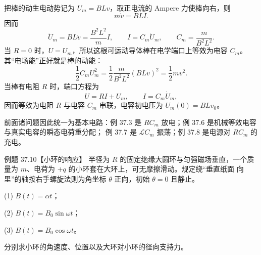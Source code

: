 \begin{xesolution}
把棒的动生电动势记为 $U_m=BLv$，取正电流的 Ampere 力使棒向右，则
\begin{equation}
  m\dot v=BLI.
\end{equation}
因而
\begin{equation}
  \dot U_m=BL\dot v=\frac{B^2L^2}{m}I,
  \qquad
  \boxed{I=C_m\dot U_m},
  \qquad
  \boxed{C_m=\frac{m}{B^2L^2}}.
\end{equation}
当 $R=0$ 时，$U=U_m$，所以这根可运动导体棒在电学端口上等效为电容 $C_m$。其“电场能”正好就是棒的动能：
\begin{equation}
  \frac12C_mU_m^2=\frac12\frac{m}{B^2L^2}(BLv)^2=\frac12mv^2.
\end{equation}
当棒有电阻 $R$ 时，端口方程为
\begin{equation}
  \boxed{U=RI+U_m},
  \qquad I=C_m\dot U_m,
\end{equation}
因而等效为电阻 $R$ 与电容 $C_m$ 串联，电容初电压为 $U_m(0)=BLv_0$。

前面诸问题因此统一为基本电路：例 37.3 是 $RC_m$ 放电；例 37.6 是机械等效电容与真实电容的瞬态电荷重分配；
例 37.7 是 $\mathcal LC_m$ 振荡；例 37.8 是电源对 $RC_m$ 的充电。

\equivalentCircuitDiagram
\end{xesolution}

\Needspace{0.12\textheight}
\begin{origexamplebox}{例题 37.10【小环的响应】}
半径为 $R$ 的固定绝缘大圆环与匀强磁场垂直，一个质量为 $m$、电荷为 $+q$ 的小环套在大环上，可无摩擦滑动。规定绕“垂直纸面
向里”的轴按右手螺旋法则为角坐标 $\theta$ 正向，初始 $\theta=0$ 且静止。

(1) $B(t)=\alpha t$；

(2) $B(t)=B_0\sin\omega t$；

(3) $B(t)=B_0\cos\omega t$。

分别求小环的角速度、位置以及大环对小环的径向支持力。
\end{origexamplebox}

